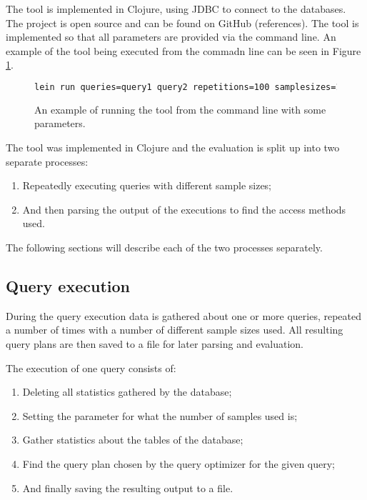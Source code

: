 The tool is implemented in Clojure, using JDBC to connect to the databases. The
project is open source and can be found on GitHub (references). The tool is
implemented so that all parameters are provided via the command line. An example
of the tool being executed from the commadn line can be seen in Figure \ref{fig:cmd:running}.

\begin{figure}[ht]
  \caption[Running the tool from the command line]{An example of running the
  tool from the command line with some parameters.}
  \begin{lstlisting}[language=bash]
    lein run queries=query1 query2 repetitions=100 samplesizes=10 100 --database=postgresql
  \end{lstlisting} \label{fig:cmd:running}
\end{figure}

The tool was implemented in Clojure and the evaluation is split up into two
separate processes:
\begin{enumerate}
\item Repeatedly executing queries with different sample sizes;
\item And then parsing the output of the executions to find the access methods used.
\end{enumerate}

The following sections will describe each of the two processes separately.

\subsection{Query execution} \label{sec:queryexecution}
During the query execution data is gathered about one or more queries, repeated
a number of times with a number of different sample sizes used. All resulting
query plans are then saved to a file for later parsing and evaluation.

The execution of one query consists of:
\begin{enumerate}
\item Deleting all statistics gathered by the database;
\item Setting the parameter for what the number of samples used is;
\item Gather statistics about the tables of the database;
\item Find the query plan chosen by the query optimizer for the given query;
\item And finally saving the resulting output to a file.
\end{enumerate}

